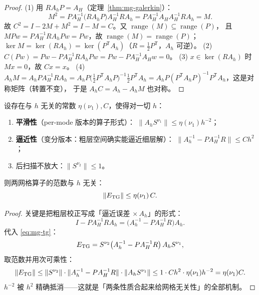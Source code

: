 \begin{proof}
(1) 用 $RA_hP=A_H$（定理~\ref{thm:mg-galerkin}）：
\begin{equation}
  M^2=PA_H^{-1}\bigl(RA_hP\bigr)A_H^{-1}RA_h=PA_H^{-1}A_HA_H^{-1}RA_h=M .
\end{equation}
故 $C^2=I-2M+M^2=I-M=C$。又 $\operatorname{range}(M)\subseteq\operatorname{range}(P)$，
且 $MPw=PA_H^{-1}RA_hPw=Pw$，故 $\operatorname{range}(M)=\operatorname{range}(P)$；
$\ker M=\ker(RA_h)=\ker(P^{\mathsf T}A_h)$（$R=\frac12P^{\mathsf T}$，$A_h$ 可逆）。
(2) $C(Pw)=Pw-PA_H^{-1}RA_hPw=Pw-PA_H^{-1}A_Hw=0$。
(3) $x\in\ker(RA_h)$ 时 $Mx=0$，故 $Cx=x$。
(4) $A_hM=A_hPA_H^{-1}RA_h=A_hP\bigl(\tfrac12P^{\mathsf T}A_hP\bigr)^{-1}\tfrac12P^{\mathsf T}A_h
=A_hP(P^{\mathsf T}A_hP)^{-1}P^{\mathsf T}A_h$，这是对称矩阵（转置不变），
于是 $A_hC=A_h-A_hM$ 也对称。
\end{proof}

\begin{theorem}
\label{thm:mg-two-property}
设存在与 $h$ 无关的常数 $\eta(\nu_1),C$，使得对一切 $h$：
\begin{enumerate}
  \item \textbf{平滑性}（per-mode 版本的算子形式）：
        $\|A_hS^{\nu_1}\|\le\eta(\nu_1)h^{-2}$；
  \item \textbf{逼近性}（变分版本：粗层空间确实能逼近细层解）：
        $\|A_h^{-1}-PA_H^{-1}R\|\le Ch^{2}$；
  \item 后扫描不放大：$\|S^{\nu_2}\|\le1$。
\end{enumerate}
则两网格算子的范数与 $h$ 无关：
\begin{equation}
  \|E_{\rm TG}\|\le\eta(\nu_1)\,C .
  \label{eq:mg-two-property}
\end{equation}
\end{theorem}

\begin{proof}
关键是把粗层校正写成「逼近误差 $\times\,A_h$」的形式：
\begin{equation}
  I-PA_H^{-1}RA_h=\bigl(A_h^{-1}-PA_H^{-1}R\bigr)A_h .
\end{equation}
代入 \eqref{eq:mg-tg}：
\begin{equation}
  E_{\rm TG}=S^{\nu_2}\bigl(A_h^{-1}-PA_H^{-1}R\bigr)\,A_hS^{\nu_1},
\end{equation}
取范数并用次可乘性：
\begin{equation}
  \|E_{\rm TG}\|\le\|S^{\nu_2}\|\cdot\|A_h^{-1}-PA_H^{-1}R\|\cdot\|A_hS^{\nu_1}\|
  \le 1\cdot Ch^{2}\cdot\eta(\nu_1)h^{-2}=\eta(\nu_1)C .
\end{equation}
$h^{-2}$ 被 $h^{2}$ 精确抵消——这就是「两条性质合起来给网格无关性」的全部机制。
\end{proof}

